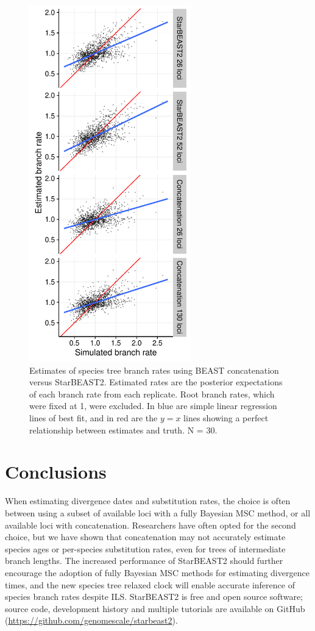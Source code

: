 \documentclass[nogrid]{MBE}%
\begin{document}
\begin{figure}[htb!]
\centering
\includegraphics[width=70mm]{branch_rates_phased.pdf}
\caption
{Estimates of species tree branch rates using BEAST concatenation versus
StarBEAST2. Estimated rates are the posterior expectations of each branch rate
from each replicate. Root branch rates, which were fixed at 1, were excluded.
In blue are simple linear regression lines of best fit, and in red are the $y
= x$ lines showing a perfect relationship between estimates and truth. N = 30.}
\label{fig:branchRates}
\end{figure}

\section{Conclusions}

When estimating divergence dates and substitution rates, the choice is often
between using a subset of available loci with a fully Bayesian MSC method, or
all available loci with concatenation. Researchers have often opted for the
second choice, but we have shown that concatenation may not accurately
estimate species ages or per-species substitution rates, even
for trees of intermediate branch lengths. The increased performance of
StarBEAST2 should further encourage the adoption of fully Bayesian MSC methods
for estimating divergence times, and the new species tree relaxed clock will
enable accurate inference of species branch rates despite ILS. StarBEAST2 is
free and open source software; source code, development history and multiple
tutorials are available on GitHub (\url{https://github.com/genomescale/starbeast2}).
\end{document}
